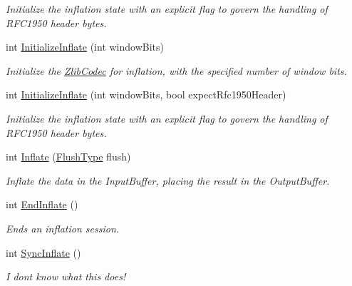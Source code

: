 \begin{DoxyCompactItemize}
\begin{DoxyCompactList}\small\item\em Initialize the inflation state with an explicit flag to govern the handling of R\+F\+C1950 header bytes. \end{DoxyCompactList}\item 
int \mbox{\hyperlink{class_super_tiled2_unity_1_1_ionic_1_1_zlib_1_1_zlib_codec_a7e6db58967fbb7a5ed726aa8922e3406}{Initialize\+Inflate}} (int window\+Bits)
\begin{DoxyCompactList}\small\item\em Initialize the \mbox{\hyperlink{class_super_tiled2_unity_1_1_ionic_1_1_zlib_1_1_zlib_codec}{Zlib\+Codec}} for inflation, with the specified number of window bits. \end{DoxyCompactList}\item 
int \mbox{\hyperlink{class_super_tiled2_unity_1_1_ionic_1_1_zlib_1_1_zlib_codec_a3104516f5fd8ab82eac15ee761d7bb91}{Initialize\+Inflate}} (int window\+Bits, bool expect\+Rfc1950\+Header)
\begin{DoxyCompactList}\small\item\em Initialize the inflation state with an explicit flag to govern the handling of R\+F\+C1950 header bytes. \end{DoxyCompactList}\item 
int \mbox{\hyperlink{class_super_tiled2_unity_1_1_ionic_1_1_zlib_1_1_zlib_codec_a9586e5a25c06331824638439938ac8c8}{Inflate}} (\mbox{\hyperlink{namespace_super_tiled2_unity_1_1_ionic_1_1_zlib_a2c5853fd63f03c83ac2458da1f4ff3bc}{Flush\+Type}} flush)
\begin{DoxyCompactList}\small\item\em Inflate the data in the Input\+Buffer, placing the result in the Output\+Buffer. \end{DoxyCompactList}\item 
int \mbox{\hyperlink{class_super_tiled2_unity_1_1_ionic_1_1_zlib_1_1_zlib_codec_a66b84e956a676ace6e5acda167693d92}{End\+Inflate}} ()
\begin{DoxyCompactList}\small\item\em Ends an inflation session. \end{DoxyCompactList}\item 
int \mbox{\hyperlink{class_super_tiled2_unity_1_1_ionic_1_1_zlib_1_1_zlib_codec_a8cc5d2325d22513a02d5fef0ec28a411}{Sync\+Inflate}} ()
\begin{DoxyCompactList}\small\item\em I don\textquotesingle{}t know what this does! \end{DoxyCompactList}\item 

\end{DoxyCompactItemize}
